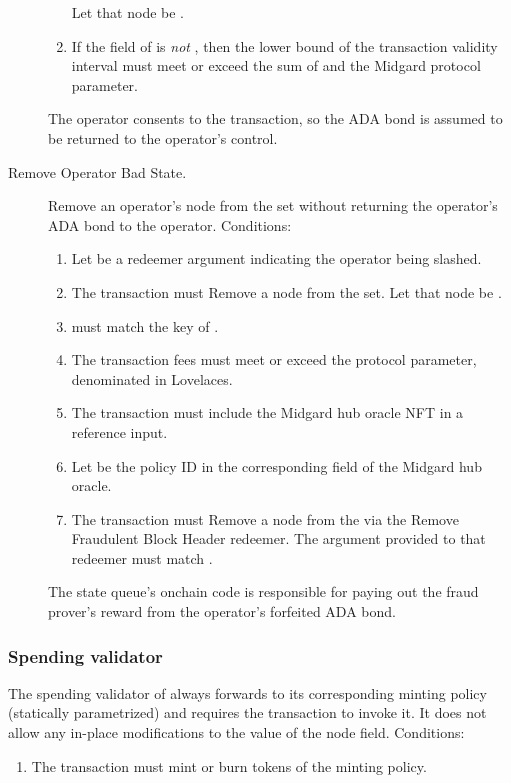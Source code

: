\documentclass[../midgard.tex]{subfiles}
\begin{document}
\begin{description}
\begin{enumerate}
              Let that node be .
            \item If the  field of  is \emph{not} , then the lower bound of the transaction validity interval must meet or exceed the sum of  and the Midgard  protocol parameter.
        \end{enumerate}
    The operator consents to the transaction, so the ADA bond is assumed to be returned to the operator's control.
    \item[Remove Operator Bad State.] Remove an operator's node from the  set without returning the operator's ADA bond to the operator.
      Conditions:
        \begin{enumerate}
            \item Let  be a redeemer argument indicating the operator being slashed.
            \item The transaction must Remove a node from the  set.
              Let that node be .
            \item {} must match the key of .
            \item The transaction fees must meet or exceed the  protocol parameter, denominated in Lovelaces.
            \item The transaction must include the Midgard hub oracle NFT in a reference input.
            \item Let  be the policy ID in the corresponding field of the Midgard hub oracle.
            \item The transaction must Remove a node from the  via the Remove Fraudulent Block Header redeemer.
              The  argument provided to that redeemer must match .
        \end{enumerate}

        The state queue's onchain code is responsible for paying out the fraud prover's reward from the operator's forfeited ADA bond.
\end{description}

\subsubsection{Spending validator}
\label{h:retired-operators-spending-validator}

The spending validator of  always forwards to its corresponding minting policy (statically parametrized) and requires the transaction to invoke it.
It does not allow any in-place modifications to the  value of the node  field.
Conditions:
\begin{enumerate}
    \item The transaction must mint or burn tokens of the  minting policy.
\end{enumerate}
\end{document}
